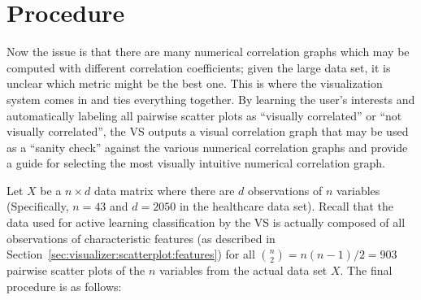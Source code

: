 \section{Procedure}
\label{sec:usage:newanalysis}

Now the issue is that there are many numerical correlation graphs which may be 
computed with different correlation coefficients; given the large data set, it 
is unclear which metric might be the best one. This is where the visualization 
system comes in and ties everything together. By learning the user's interests 
and automatically labeling all pairwise scatter plots as ``visually 
correlated'' or ``not visually correlated'', the 
VS outputs a visual correlation graph that may be used as a ``sanity check'' 
against the various numerical correlation graphs and provide a guide for 
selecting the most visually intuitive numerical correlation graph.

Let $X$ be a $n\times d$ data matrix where there are $d$ observations of $n$ 
variables (Specifically, $n = 43$ and $d = 2050$ in the healthcare data set). 
Recall that the data used for active learning classification by the 
VS is actually 
composed of all observations of characteristic features (as described in 
Section~\ref{sec:visualizer:scatterplot:features}) for all ${n\choose 2} = 
n(n-1)/2 = 903$ pairwise scatter plots of the $n$ variables from the actual 
data set $X$. The final procedure is as follows:

